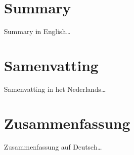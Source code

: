\chapter*{Summary}

{%
Summary in English\ldots
}
\afterpage{\pagecolor{none}}

\chapter*{Samenvatting}

{%
Samenvatting in het Nederlands\ldots
}

\afterpage{\pagecolor{none}}

\chapter*{Zusammenfassung}

{%
	Zusammenfassung auf Deutsch\ldots
}

\afterpage{\pagecolor{none}}